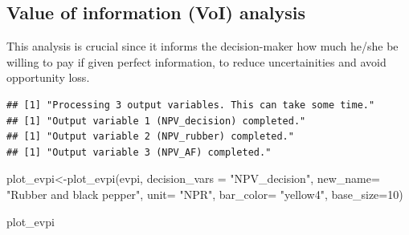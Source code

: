 \documentclass[
]{article}
\newenvironment{Shaded}{\begin{snugshade}}{\end{snugshade}}
\newcommand{\AttributeTok}[1]{\textcolor[rgb]{0.77,0.63,0.00}{#1}}
\newcommand{\ConstantTok}[1]{\textcolor[rgb]{0.00,0.00,0.00}{#1}}
\newcommand{\DecValTok}[1]{\textcolor[rgb]{0.00,0.00,0.81}{#1}}
\newcommand{\FunctionTok}[1]{\textcolor[rgb]{0.00,0.00,0.00}{#1}}
\newcommand{\NormalTok}[1]{#1}
\newcommand{\OtherTok}[1]{\textcolor[rgb]{0.56,0.35,0.01}{#1}}
\newcommand{\SpecialCharTok}[1]{\textcolor[rgb]{0.00,0.00,0.00}{#1}}
\newcommand{\StringTok}[1]{\textcolor[rgb]{0.31,0.60,0.02}{#1}}
\begin{document}
\hypertarget{value-of-information-voi-analysis}{%
\subsection{\texorpdfstring{\textbf{Value of information (VoI) analysis}}{Value of information (VoI) analysis}}\label{value-of-information-voi-analysis}}

This analysis is crucial since it informs the decision-maker how much he/she be willing to pay if given perfect information, to reduce uncertainities and avoid opportunity loss.

\begin{Shaded}
\end{Shaded}

\begin{verbatim}
## [1] "Processing 3 output variables. This can take some time."
## [1] "Output variable 1 (NPV_decision) completed."
## [1] "Output variable 2 (NPV_rubber) completed."
## [1] "Output variable 3 (NPV_AF) completed."
\end{verbatim}

\begin{Shaded}
\begin{Highlighting}[]
\NormalTok{plot\_evpi}\OtherTok{\textless{}{-}}\FunctionTok{plot\_evpi}\NormalTok{(evpi,}
          \AttributeTok{decision\_vars =} \StringTok{"NPV\_decision"}\NormalTok{,}
          \AttributeTok{new\_name=} \StringTok{"Rubber and black pepper"}\NormalTok{,}
          \AttributeTok{unit=} \StringTok{"NPR"}\NormalTok{,}
          \AttributeTok{bar\_color=} \StringTok{"yellow4"}\NormalTok{,}
          \AttributeTok{base\_size=}\DecValTok{10}\NormalTok{)}

\NormalTok{plot\_evpi}
\end{Highlighting}
\end{Shaded}
\end{document}
